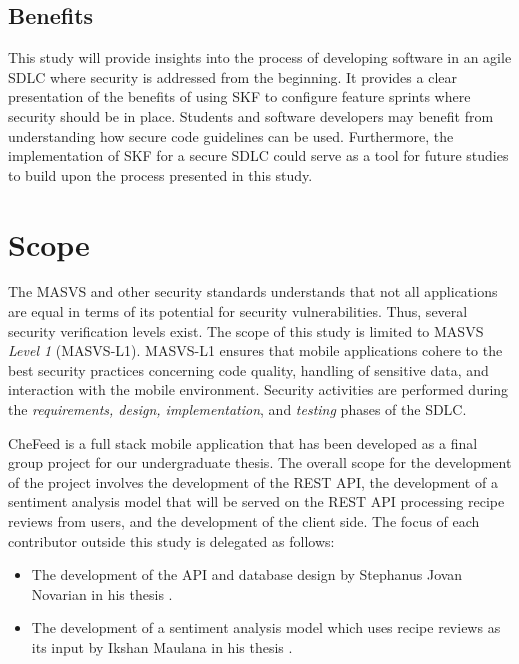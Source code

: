 
\subsection{Benefits}
This study will provide insights into the process of developing software in an agile SDLC where security is addressed from the beginning. It provides a clear presentation of the benefits of using SKF to configure feature sprints where security should be in place. Students and software developers may benefit from understanding how secure code guidelines can be used. Furthermore, the implementation of SKF for a secure SDLC could serve as a tool for future studies to build upon the process presented in this study.

\section{Scope}
The MASVS and other security standards understands that not all applications are equal in terms of its potential for security vulnerabilities. Thus, several security verification levels exist. The scope of this study is limited to MASVS \emph{Level 1} (MASVS-L1). MASVS-L1 ensures that mobile applications cohere to the best security practices concerning code quality, handling of sensitive data, and interaction with the mobile environment. Security activities are performed during the \emph{requirements, design, implementation}, and \emph{testing} phases of the SDLC.

CheFeed is a full stack mobile application that has been developed as a final group project for our undergraduate thesis. The overall scope for the development of the project involves the development of the REST API, the development of a sentiment analysis model that will be served on the REST API processing recipe reviews from users, and the development of the client side. The focus of each contributor outside this study is delegated as follows:

\begin{itemize}
    \item The development of the API and database design by Stephanus Jovan Novarian in his thesis .
    \item The development of a sentiment analysis model which uses recipe reviews as its input by Ikshan Maulana in his thesis .
\end{itemize}

